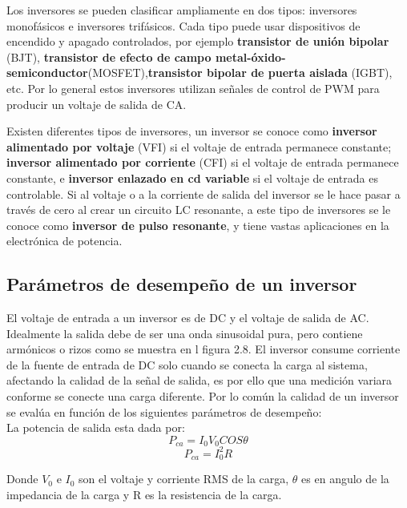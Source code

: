 Los inversores se pueden clasificar ampliamente en dos tipos: inversores monofásicos e inversores trifásicos. Cada tipo puede usar dispositivos de encendido y apagado controlados, por ejemplo \textbf{transistor de unión bipolar} (BJT), \textbf{transistor de efecto de campo metal-óxido-semiconductor}(MOSFET),\textbf{transistor bipolar de puerta aislada} (IGBT), etc. Por lo general estos inversores utilizan señales de control de PWM para producir un voltaje de salida de CA.

Existen diferentes tipos de inversores, un inversor se conoce como \textbf{inversor alimentado por voltaje} (VFI) si el voltaje de entrada permanece constante; \textbf{inversor alimentado por corriente} (CFI) si el voltaje de entrada permanece constante, e \textbf{inversor enlazado en cd variable} si el voltaje de entrada es controlable. Si al voltaje o a la corriente de salida del inversor se le hace pasar a través de cero al crear un circuito LC resonante, a este tipo de inversores se le conoce como \textbf{inversor de pulso resonante}, y tiene vastas aplicaciones en la electrónica de potencia. \\

\subsection{Parámetros de desempeño de un inversor}

El voltaje de entrada a un inversor es de DC y el voltaje de salida de AC. Idealmente la salida debe de ser una onda sinusoidal pura, pero contiene armónicos o rizos como se muestra en l figura 2.8. El inversor consume corriente de la fuente de entrada de DC solo cuando se conecta la carga al sistema, afectando la calidad de la señal de salida, es por ello que una medición variara conforme se conecte una carga diferente. Por lo común la calidad de un inversor se evalúa en función de los siguientes parámetros de desempeño:\\

La potencia de salida esta dada por: \begin{equation}
P_{ca}=I_{0}V_{0}COS\theta
\end{equation}
\begin{equation}
P_{ca}= I_{0}^{2}R
\end{equation}

Donde $V_{0}$ e $I_{0}$ son el voltaje y corriente RMS de la carga, $\theta$ es en angulo de la impedancia de la carga y R es la resistencia de la carga.\\

